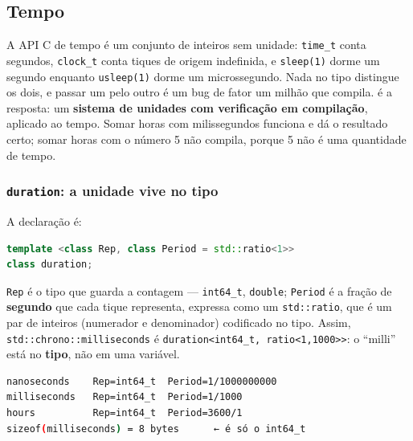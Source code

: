 \subsection{Tempo}
\label{sec:chrono}

\begin{porque}
A API C de tempo é um conjunto de inteiros sem unidade: \texttt{time\_t} conta
segundos, \texttt{clock\_t} conta tiques de origem indefinida, e
\texttt{sleep(1)} dorme um segundo enquanto \texttt{usleep(1)} dorme um
microssegundo. Nada no tipo distingue os dois, e passar um pelo outro é um bug
de fator um milhão que compila.  é a resposta: um
\textbf{sistema de unidades com verificação em compilação}, aplicado ao tempo.
Somar horas com milissegundos funciona e dá o resultado certo; somar horas com
o número 5 não compila, porque 5 não é uma quantidade de tempo.
\end{porque}

\subsubsection{\texttt{duration}: a unidade vive no tipo}

A declaração é:

\begin{lstlisting}[style=bt, language=C++,
    caption={A forma geral de uma duração.}]
template <class Rep, class Period = std::ratio<1>>
class duration;
\end{lstlisting}

\texttt{Rep} é o tipo que guarda a contagem --- \texttt{int64\_t},
\texttt{double}; \texttt{Period} é a fração de \textbf{segundo} que cada tique
representa, expressa como um \texttt{std::ratio}, que é um par de inteiros
(numerador e denominador) codificado no tipo. Assim,
\texttt{std::chrono::milliseconds} é \texttt{duration<int64\_t, ratio<1,1000>>}:
o ``milli'' está no \textbf{tipo}, não em uma variável.

\begin{lstlisting}[style=bt, language=bash,
    caption={Saída de \texttt{src/chrono/}: as unidades e o que elas custam.}]
nanoseconds    Rep=int64_t  Period=1/1000000000
milliseconds   Rep=int64_t  Period=1/1000
hours          Rep=int64_t  Period=3600/1
sizeof(milliseconds) = 8 bytes      ← é só o int64_t
\end{lstlisting}

